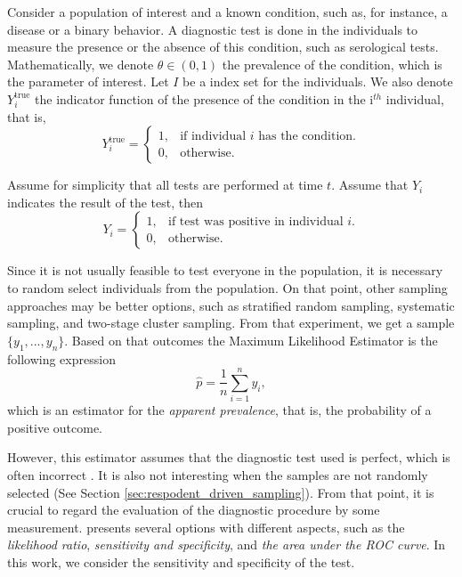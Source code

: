 Consider a population of interest and a known condition, such as, for instance,
a disease or a binary behavior. A diagnostic test is done in the individuals
to measure the presence or the absence of this condition, such as serological
tests. Mathematically, we denote
$\theta \in (0,1)$ the prevalence of the condition, which is the parameter of
interest. Let $I$ be a index set for the individuals. We also denote $Y^{\mathrm{true}}_i$ the indicator function of the presence of the
condition in the i$^{th}$ individual, that is, 
$$Y^{\mathrm{true}}_i = \begin{cases}
  1, &\text{if individual } i \text{ has the condition.} \\
  0, &\text{otherwise.}
\end{cases}$$

Assume for simplicity that all tests are performed at time $t$. Assume that
$Y_i$ indicates the result of the test, then 
$$Y_i = \begin{cases}
  1, &\text{if test was positive in individual } i. \\
  0, &\text{otherwise.}
\end{cases}$$

Since it is not usually feasible to test everyone in the population, it is
necessary to random select individuals from the population. On that point,
other sampling approaches may be better options, such as stratified random
sampling, systematic sampling, and two-stage cluster sampling. From that
experiment, we get a sample $\{y_1, ..., y_n\}$. Based on that outcomes the Maximum Likelihood Estimator is the following expression 
\begin{equation}
    \label{eq:naive-estimator}
    \hat{p} = \frac{1}{n}\sum_{i=1}^n y_i, 
\end{equation}
which is an estimator for the {\em apparent prevalence}, that is, the
probability of a positive outcome. 

However, this estimator assumes that the diagnostic test used is perfect,
which is often incorrect . It is also not
interesting when the samples are not randomly selected (See Section
\ref{sec:respodent_driven_sampling}). From that point, it is crucial to regard
the evaluation of the diagnostic procedure by some measurement. \textcite[p.
2]{vsimundic2009measures} presents several options with different aspects,
such as the {\em likelihood ratio}, {\em sensitivity and specificity}, and
{\em the area under the ROC curve}. In this work, we consider the sensitivity
and specificity of the test. 


